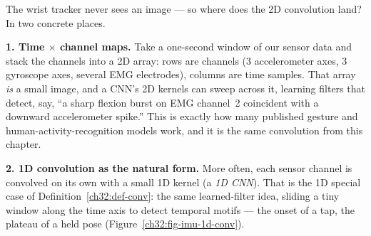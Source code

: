 \begin{goalbox}
The wrist tracker never sees an image --- so where does the 2D convolution land?
In two concrete places.

\textbf{1. Time $\times$ channel maps.} Take a one-second window of our sensor
data and stack the channels into a 2D array: rows are channels (3 accelerometer
axes, 3 gyroscope axes, several EMG electrodes), columns are time samples. That
array \emph{is} a small image, and a CNN's 2D kernels can sweep across it,
learning filters that detect, say, ``a sharp flexion burst on EMG channel~2
coincident with a downward accelerometer spike.'' This is exactly how many
published gesture and human-activity-recognition models work, and it is the
same convolution from this chapter.

\textbf{2. 1D convolution as the natural form.} More often, each sensor channel
is convolved on its own with a small 1D kernel (a \emph{1D CNN}). That is
the 1D special case of Definition~\ref{ch32:def-conv}: the same
learned-filter idea, sliding a tiny window along the time axis to detect
temporal motifs --- the onset of a tap, the plateau of a held pose (Figure~\ref{ch32:fig-imu-1d-conv}).


\begin{figure}[H]
\centering
{}
\end{figure}
\end{goalbox}
